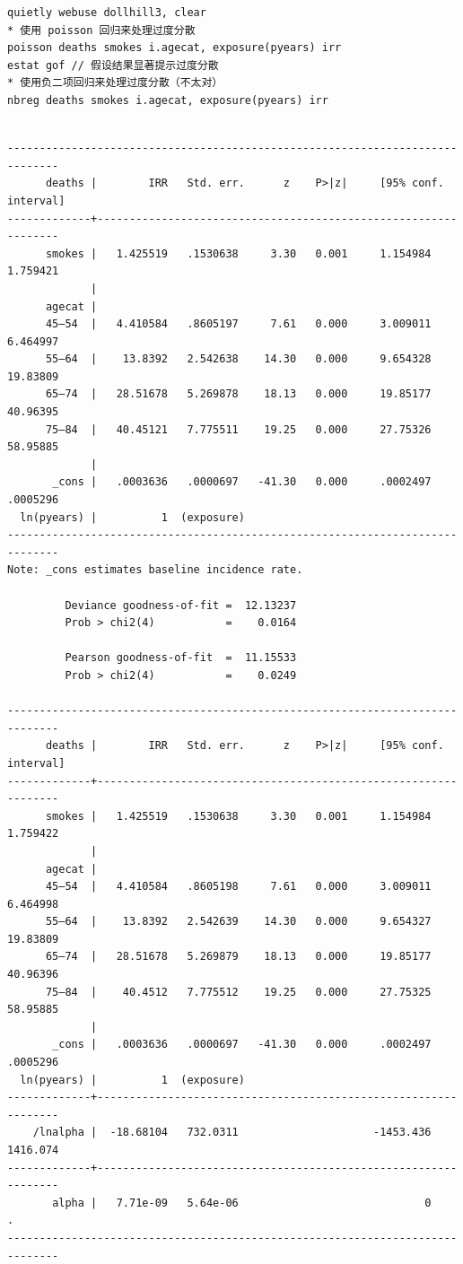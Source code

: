 \begin{tcolorbox}[title=在 Stata 中估计 Poisson 模型和负二项模型, colback=white, colframe=black, colbacktitle=white, coltitle=black,fonttitle=\bfseries]
\begin{lstlisting}[xleftmargin=2em, commentstyle=\color{black}]
quietly webuse dollhill3, clear
* 使用 poisson 回归来处理过度分散
poisson deaths smokes i.agecat, exposure(pyears) irr
estat gof // 假设结果显著提示过度分散
* 使用负二项回归来处理过度分散（不太对）
nbreg deaths smokes i.agecat, exposure(pyears) irr
\end{lstlisting}
\vspace{-2em}
\begin{Verbatim}[commandchars=\\\{\},xleftmargin=2em]

------------------------------------------------------------------------------
      deaths |        IRR   Std. err.      z    P>|z|     [95% conf. interval]
-------------+----------------------------------------------------------------
      smokes |   1.425519   .1530638     3.30   0.001     1.154984    1.759421
             |
      agecat |
      45–54  |   4.410584   .8605197     7.61   0.000     3.009011    6.464997
      55–64  |    13.8392   2.542638    14.30   0.000     9.654328    19.83809
      65–74  |   28.51678   5.269878    18.13   0.000     19.85177    40.96395
      75–84  |   40.45121   7.775511    19.25   0.000     27.75326    58.95885
             |
       _cons |   .0003636   .0000697   -41.30   0.000     .0002497    .0005296
  ln(pyears) |          1  (exposure)
------------------------------------------------------------------------------
Note: _cons estimates baseline incidence rate.

         Deviance goodness-of-fit =  12.13237
         Prob > chi2(4)           =    0.0164

         Pearson goodness-of-fit  =  11.15533
         Prob > chi2(4)           =    0.0249

------------------------------------------------------------------------------
      deaths |        IRR   Std. err.      z    P>|z|     [95% conf. interval]
-------------+----------------------------------------------------------------
      smokes |   1.425519   .1530638     3.30   0.001     1.154984    1.759422
             |
      agecat |
      45–54  |   4.410584   .8605198     7.61   0.000     3.009011    6.464998
      55–64  |    13.8392   2.542639    14.30   0.000     9.654327    19.83809
      65–74  |   28.51678   5.269879    18.13   0.000     19.85177    40.96396
      75–84  |    40.4512   7.775512    19.25   0.000     27.75325    58.95885
             |
       _cons |   .0003636   .0000697   -41.30   0.000     .0002497    .0005296
  ln(pyears) |          1  (exposure)
-------------+----------------------------------------------------------------
    /lnalpha |  -18.68104   732.0311                     -1453.436    1416.074
-------------+----------------------------------------------------------------
       alpha |   7.71e-09   5.64e-06                             0           .
------------------------------------------------------------------------------


\end{Verbatim}
\end{tcolorbox}
